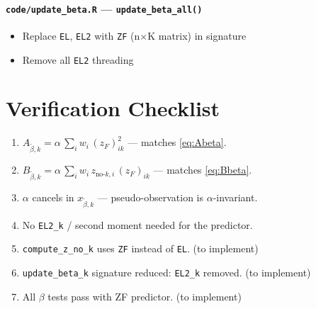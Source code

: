 \documentclass[11pt]{article}
\begin{document}
\paragraph{\texttt{code/update\_beta.R} — \texttt{update\_beta\_all()}}
\begin{itemize}
  \item Replace \texttt{EL}, \texttt{EL2} with \texttt{ZF} (n$\times$K matrix) in signature
  \item Remove all \texttt{EL2} threading
\end{itemize}

\section{Verification Checklist}

\begin{verifybox}[D3 Verification]
\begin{enumerate}
  \item $A_{\tilde\beta,k} = \alpha\,\sum_i w_i\,(z_F)_{ik}^2$ — matches \eqref{eq:Abeta}. \checkmark
  \item $B_{\tilde\beta,k} = \alpha\,\sum_i w_i\,z_{\text{no-}k,i}\,(z_F)_{ik}$ — matches \eqref{eq:Bbeta}. \checkmark
  \item $\alpha$ cancels in $x_{\tilde\beta,k}$ — pseudo-observation is $\alpha$-invariant. \checkmark
  \item No \texttt{EL2\_k} / second moment needed for the predictor. \checkmark
  \item \texttt{compute\_z\_no\_k} uses \texttt{ZF} instead of \texttt{EL}. (to implement)
  \item \texttt{update\_beta\_k} signature reduced: \texttt{EL2\_k} removed. (to implement)
  \item All $\beta$ tests pass with ZF predictor. (to implement)
\end{enumerate}
\end{verifybox}
\end{document}

